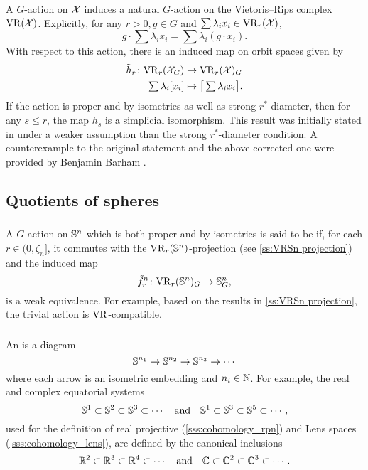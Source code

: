 A \(G\)-action on $\mathcal{X}$ induces a natural \(G\)-action on the Vietoris--Rips complex $\mathrm{VR}(\mathcal{X})$.
Explicitly, for any \(r > 0, g\in G\) and $\sum \lambda_i x_i \in \mathrm{VR}_r(\mathcal{X})$,
\[
g \cdot \sum \lambda_i x_i = \sum \lambda_i (g\cdot x_i).
\]
With respect to this action, there is an induced map on orbit spaces given by
\begin{align*}
	\tilde h_r \colon \mathrm{VR}_r(\mathcal{X}_G) &\to \mathrm{VR}_r(\mathcal{X})_G \\
	\textstyle\sum\lambda_i [x_i] &\mapsto \textstyle \big[\sum\lambda_i x_i\big].
\end{align*}
If the action is proper and by isometries as well as strong \(r^*\)-diameter, then for any \(s \leq r\), the map $\tilde{h}_s$ is a simplicial isomorphism.
This result was initially stated in \cite[Prop.~3.5]{adams2022metric} under a weaker assumption than the strong \(r^*\)-diameter condition.
A counterexample to the original statement and the above corrected one were provided by Benjamin Barham \cite{barham2024group}. 

\subsection{Quotients of spheres}

\subsubsection{}
\label{subsub:VR-compatible-Sn}
A \(G\)-action on \(\mathbb{S}^n\) which is both proper and by isometries is said to be  if, for each $r \in (0, \zeta_n]$, it commutes with the \(\mathrm{VR}_r(\mathbb{S}^n)\)-projection (see \cref{ss:VRSn projection}) and the induced map
\[
\tilde f_r^n \colon \mathrm{VR}_r(\mathbb{S}^n)_G \to \mathbb{S}^n_G,
\]
is a weak equivalence.
For example, based on the results in \cref{ss:VRSn projection}, the trivial action is \(\mathrm{VR}\)-compatible.

\subsubsection{}
\label{subsub:VR-compatible-system}
An  is a diagram
\[
\mathbb{S}^{n_1} \to \mathbb{S}^{n_2} \to \mathbb{S}^{n_3} \to \dotsb
\]
where each arrow is an isometric embedding and $n_i \in \mathbb{N}$.
For example, the real and complex equatorial systems
\[
\mathbb{S}^1 \subset \mathbb{S}^2 \subset \mathbb{S}^3 \subset \dotsb
\quad\text{and}\quad
\mathbb{S}^1 \subset \mathbb{S}^3 \subset \mathbb{S}^5 \subset \dotsb,
\]
used for the definition of real projective (\cref{sss:cohomology_rpn}) and Lens spaces (\cref{sss:cohomology_lens}), are defined by the canonical inclusions
\[
\mathbb{R}^2 \subset \mathbb{R}^3 \subset \mathbb{R}^4 \subset \dotsb
\quad\text{and}\quad
\mathbb{C} \subset \mathbb{C}^2 \subset \mathbb{C}^3 \subset \dotsb.
\]

